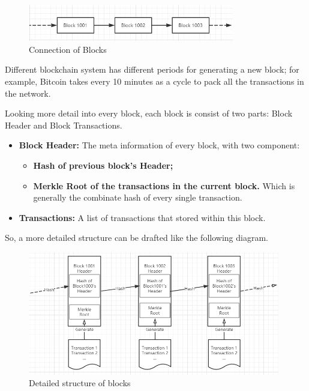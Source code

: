 \documentclass[runningheads]{llncs}
\begin{document}
\begin{figure}[H]
	\centering
	\includegraphics[width=9cm]{reportpics/1.png}
	\caption{Connection of Blocks}
	\label{connection of Blocks}
\end{figure}

Different blockchain system has different periods for generating a new block; for example, Bitcoin takes every 10 minutes\cite{nakamoto2008bitcoin} as a cycle to pack all the transactions in the network.

Looking more detail into every block, each block is consist of two parts: Block Header and Block Transactions.

\begin{itemize}
	\item \textbf{Block Header:} The meta information of every block, with two component:
	      \begin{itemize}
		      \item \textbf{Hash of previous block’s Header;}
		      \item \textbf{Merkle Root of the transactions in the current block.} Which is generally the combinate hash of every single transaction.
	      \end{itemize}
	\item \textbf{Transactions:} A list of transactions that stored within this block.
\end{itemize}

So, a more detailed structure can be drafted like the following diagram.

\begin{figure}[H]
	\centering
	\includegraphics[width=11cm]{reportpics/2.png}
	\caption{Detailed structure of blocks}
	\label{detailed structure of blocks}
\end{figure}
\end{document}
